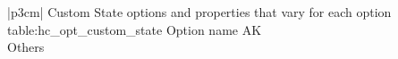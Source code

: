 \begin{customLongTable}{ |p{3cm}| }
{Custom State options and properties that vary for each option} {table:hc_opt_custom_state}
{Option name}
AK \\ \hline
Others \\
\end{customLongTable}
